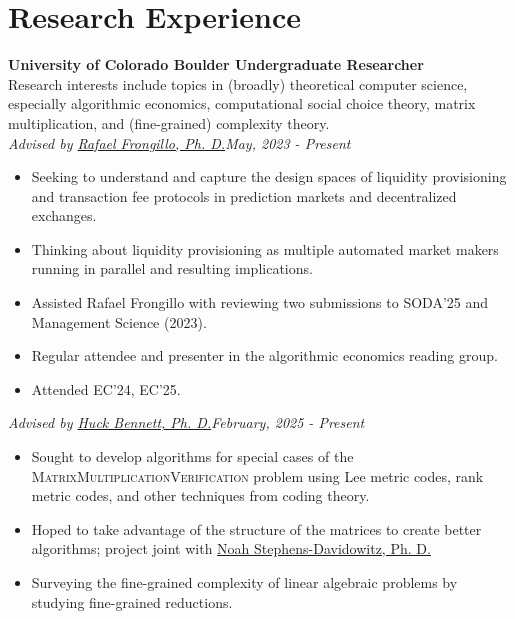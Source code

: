 \documentclass[a4paper,20pt]{article}
\begin{document}
    \vspace{-5pt}
    \section{Research Experience}
    \textbf{University of Colorado Boulder \hfill{Undergraduate Researcher}} \\
    Research interests include topics in (broadly) theoretical computer science, especially algorithmic economics, computational social choice theory, matrix multiplication, and (fine-grained) complexity theory.
    \\
    \emph{Advised by \href{https://raf.prof}{Rafael Frongillo, Ph. D.}}\hfill{\textit{May, 2023 - Present}}
    \\
    \begin{itemize}[label=-]
      \vspace{-5pt}
      \item Seeking to understand and capture the design spaces of liquidity provisioning and transaction fee protocols in prediction markets and decentralized exchanges.
      \vspace{-5pt}
      \item Thinking about liquidity provisioning as multiple automated market makers running in parallel and resulting implications.
      \vspace{-5pt}
      \item Assisted Rafael Frongillo with reviewing two submissions to SODA'25 and Management Science (2023).
      \vspace{-5pt}
      \item Regular attendee and presenter in the algorithmic economics reading group.
      \vspace{-5pt}
      \item Attended EC'24, EC'25.
   \end{itemize}
   \emph{Advised by \href{https://home.cs.colorado.edu/~hbennett/}{Huck Bennett, Ph. D.}}\hfill{\textit{February, 2025 - Present}}
   \\
    \begin{itemize}[label=-]
      \vspace{-5pt}
      \item Sought to develop algorithms for special cases of the \textsc{MatrixMultiplicationVerification} problem using Lee metric codes, rank metric codes, and other techniques from coding theory. 
      \vspace{-5pt}
      \item Hoped to take advantage of the structure of the matrices to create better algorithms; project joint with \href{https://www.noahsd.com}{Noah Stephens-Davidowitz, Ph. D.}
      \vspace{-5pt}
      \item Surveying the fine-grained complexity of linear algebraic problems by studying fine-grained reductions.
      \vspace{-5pt}
   \end{itemize} 
\end{document}
